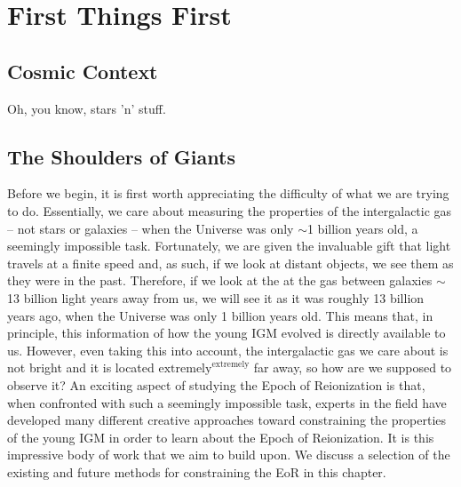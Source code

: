 


\ifpdf
    \graphicspath{{introduction/figures/PNG/}{introduction/figures/PDF/}{introduction/figures/}}
\else
    \graphicspath{{introduction/figures/EPS/}{introduction/figures/}}
\fi

\chapter{First Things First}
\section{Cosmic Context}

Oh, you know, stars 'n' stuff.

\section{The Shoulders of Giants} \label{sec:CosmicContext}

Before we begin, it is first worth appreciating the difficulty of what we are trying to do. Essentially, we care about measuring the properties of the intergalactic gas -- not stars or galaxies -- when the Universe was only $\sim$1 billion years old, a seemingly impossible task. Fortunately, we are given the invaluable gift that light travels at a finite speed and, as such, if we look at distant objects, we see them as they were in the past. Therefore, if we look at the at the gas between galaxies $\sim$13 billion light years away from us, we will see it as it was roughly 13 billion years ago, when the Universe was only 1 billion years old. This means that, in principle, this information of how the young IGM evolved is directly available to us. However, even taking this into account, the intergalactic gas we care about is not bright and it is located $\text{extremely}^{\text{extremely}}$ far away, so how are we supposed to observe it? An exciting aspect of studying the Epoch of Reionization is that, when confronted with such a seemingly impossible task, experts in the field have developed many different creative approaches toward constraining the properties of the young IGM in order to learn about the Epoch of Reionization. It is this impressive body of work that we aim to build upon. We discuss a selection of the existing and future methods for constraining the EoR in this chapter.


